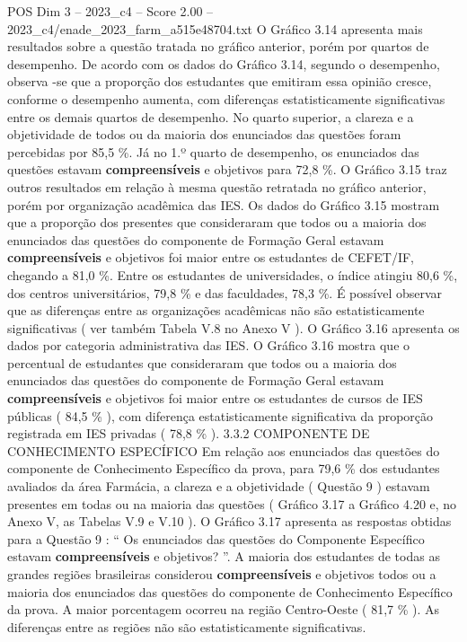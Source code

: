 \begin{textsample}{POS Dim 3 – 2023\_c4 – Score 2.00 – 2023\_c4/enade\_2023\_farm\_a515e48704.txt}
O Gráfico 3.14 apresenta mais resultados sobre a questão tratada no gráfico anterior, porém por quartos de desempenho.
De acordo com os dados do Gráfico 3.14, segundo o desempenho, observa -se que a proporção dos estudantes que emitiram essa opinião cresce, conforme o desempenho aumenta, com diferenças estatisticamente significativas entre os demais quartos de desempenho.
No quarto superior, a clareza e a objetividade de todos ou da maioria dos enunciados das questões foram percebidas por 85,5 \%.
Já no 1.º quarto de desempenho, os enunciados das questões estavam \textbf{compreensíveis} e objetivos para 72,8 \%.
O Gráfico 3.15 traz outros resultados em relação à mesma questão retratada no gráfico anterior, porém por organização acadêmica das IES.
Os dados do Gráfico 3.15 mostram que a proporção dos presentes que consideraram que todos ou a maioria dos enunciados das questões do componente de Formação Geral estavam \textbf{compreensíveis} e objetivos foi maior entre os estudantes de CEFET/IF, chegando a 81,0 \%.
Entre os estudantes de universidades, o índice atingiu 80,6 \%, dos centros universitários, 79,8 \% e das faculdades, 78,3 \%.
É possível observar que as diferenças entre as organizações acadêmicas não são estatisticamente significativas ( ver também Tabela V.8 no Anexo V ).
O Gráfico 3.16 apresenta os dados por categoria administrativa das IES.
O Gráfico 3.16 mostra que o percentual de estudantes que consideraram que todos ou a maioria dos enunciados das questões do componente de Formação Geral estavam \textbf{compreensíveis} e objetivos foi maior entre os estudantes de cursos de IES públicas ( 84,5 \% ), com diferença estatisticamente significativa da proporção registrada em IES privadas ( 78,8 \% ). 3.3.2 COMPONENTE DE CONHECIMENTO ESPECÍFICO Em relação aos enunciados das questões do componente de Conhecimento Específico da prova, para 79,6 \% dos estudantes avaliados da área Farmácia, a clareza e a objetividade ( Questão 9 ) estavam presentes em todas ou na maioria das questões ( Gráfico 3.17 a Gráfico 4.20 e, no Anexo V, as Tabelas V.9 e V.10 ).
O Gráfico 3.17 apresenta as respostas obtidas para a Questão 9 : “ Os enunciados das questões do Componente Específico estavam \textbf{compreensíveis} e objetivos? ”.
A maioria dos estudantes de todas as grandes regiões brasileiras considerou \textbf{compreensíveis} e objetivos todos ou a maioria dos enunciados das questões do componente de Conhecimento Específico da prova.
A maior porcentagem ocorreu na região Centro-Oeste ( 81,7 \% ).
As diferenças entre as regiões não são estatisticamente significativas.

\end{textsample}

